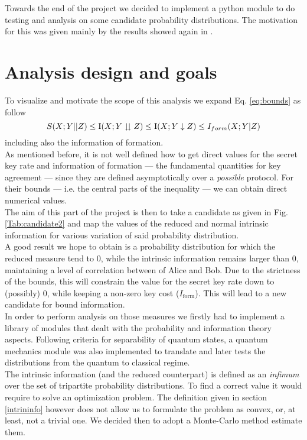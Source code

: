 \label{ch:six}
Towards the end of the project we decided to implement a python module to do testing and analysis on some candidate probability distributions. The motivation for this was given mainly by the results showed again in \cite{RW03}. 
\section{Analysis design and goals}
    To visualize and motivate the scope of this analysis we expand Eq. \ref{eq:bounds} as follow
    \begin{equation}
    	S(X;Y||Z) \leq \operatorname{I}(X;Y\downdownarrows Z) \leq \operatorname{I}(X;Y\downarrow Z) \leq I_{form} (X;Y|Z)
    \end{equation}
    including also the information of formation.\\
    As mentioned before, it is not well defined how to get direct values for the secret key rate and information of formation --- the fundamental quantities for key agreement --- since they are defined asymptotically over a \textit{possible} protocol. 
    For their bounds --- i.e. the central parts of the inequality --- we can obtain direct numerical values. \\
    The aim of this part of the project is then to take a candidate as given in Fig. \ref{Tab:candidate2} and map the values of the reduced and normal intrinsic information for various variation of said probability distribution.\\
    
    A good result we hope to obtain is a probability distribution for which the reduced measure tend to $0$, while the intrinsic information remains larger than $0$, maintaining a level of correlation between of Alice and Bob. 
    Due to the strictness of the bounds, this will constrain the value for the secret key rate down to (possibly) $0$, while keeping a non-zero key cost ($I_{\text{form}}$).
    This will lead to a new candidate for bound information.\\
    
    In order to perform analysis on those measures we firstly had to implement a library of modules that dealt with the probability and information theory aspects.
    Following criteria for separability of quantum states, a quantum mechanics module was also implemented to translate and later tests the distributions from the quantum to classical regime.\\
    The intrinsic information (and the reduced counterpart) is defined as an \emph{infimum} over the set of tripartite probability distributions. 
    To find a correct value it would require to solve an optimization problem. 
    The definition given in section \ref{intrininfo} however does not allow us to formulate the problem as convex, or, at least, not a trivial one.
    We decided then to adopt a Monte-Carlo method estimate them.\\
     

